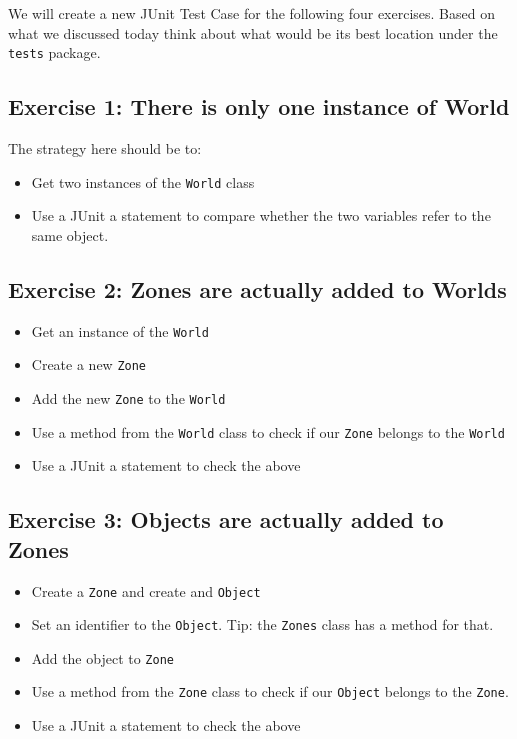 \documentclass[
]{book}
\providecommand{\tightlist}{%
  \setlength{\itemsep}{0pt}\setlength{\parskip}{0pt}}
\begin{document}
We will create a new JUnit Test Case for the following four exercises. Based on what we discussed today think about what would be its best location under the \texttt{tests} package.

\hypertarget{exercise-1-there-is-only-one-instance-of-world}{%
\subsection{Exercise 1: There is only one instance of World}\label{exercise-1-there-is-only-one-instance-of-world}}

The strategy here should be to:

\begin{itemize}
\tightlist
\item
  Get two instances of the \texttt{World} class
\item
  Use a JUnit a statement to compare whether the two variables refer to the same object.
\end{itemize}

\hypertarget{exercise-2-zones-are-actually-added-to-worlds}{%
\subsection{Exercise 2: Zones are actually added to Worlds}\label{exercise-2-zones-are-actually-added-to-worlds}}

\begin{itemize}
\tightlist
\item
  Get an instance of the \texttt{World}
\item
  Create a new \texttt{Zone}
\item
  Add the new \texttt{Zone} to the \texttt{World}
\item
  Use a method from the \texttt{World} class to check if our \texttt{Zone} belongs to the \texttt{World}
\item
  Use a JUnit a statement to check the above
\end{itemize}

\hypertarget{exercise-3-objects-are-actually-added-to-zones}{%
\subsection{Exercise 3: Objects are actually added to Zones}\label{exercise-3-objects-are-actually-added-to-zones}}

\begin{itemize}
\tightlist
\item
  Create a \texttt{Zone} and create and \texttt{Object}
\item
  Set an identifier to the \texttt{Object}. Tip: the \texttt{Zones} class has a method for that.
\item
  Add the object to \texttt{Zone}
\item
  Use a method from the \texttt{Zone} class to check if our \texttt{Object} belongs to the \texttt{Zone}.
\item
  Use a JUnit a statement to check the above\\
\end{itemize}
\end{document}
